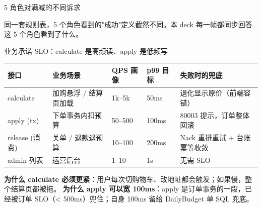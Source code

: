 \documentclass[aspectratio=169,11pt]{beamer}
\begin{document}
\begin{frame}[shrink]{5 角色对满减的不同诉求}
\vspace{2mm}
\small 同一套规则表，5 个角色看到的"成功"定义截然不同。本 deck 每一帧都同步回答这 5 个角色看到了什么。
\end{frame}

\begin{frame}[shrink]{业务承诺 SLO：calculate 是高频读、apply 是低频写}
\begin{tabular}{@{}lllll@{}}
\toprule
接口 & 业务场景 & QPS 画像 & p99 目标 & 失败时的兜底 \\
\midrule
calculate & 加购悬浮 / 结算页加载 & 1k--5k & 50ms & 退化显示原价（前端容错）\\
apply (tx) & 下单事务内扣预算 & 50--500 & 100ms & 80003 提示，订单整体回滚 \\
release (消费) & 关单 / 退款退预算 & 10--100 & 200ms & Nack 重排重试 + 台账幂等收敛 \\
admin 列表 & 运营后台 & 1--10 & 1s & 无需 SLO \\
\bottomrule
\end{tabular}
\vspace{2mm}
\small \textbf{为什么 calculate 必须更紧}：用户每次切购物车、改地址都会触发；如果慢，整个结算页都被拖。
\textbf{为什么 apply 可以宽 100ms}：apply 是订单事务的一段，已经被订单 SLO（< 500ms）兜住；自身 100ms 留给 DailyBudget 单 SQL 兜底。
\end{frame}
\end{document}
